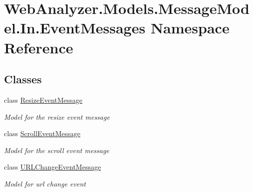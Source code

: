 \hypertarget{namespace_web_analyzer_1_1_models_1_1_message_model_1_1_in_1_1_event_messages}{}\section{Web\+Analyzer.\+Models.\+Message\+Model.\+In.\+Event\+Messages Namespace Reference}
\label{namespace_web_analyzer_1_1_models_1_1_message_model_1_1_in_1_1_event_messages}
\subsection*{Classes}
\begin{DoxyCompactItemize}
\item 
class \hyperlink{class_web_analyzer_1_1_models_1_1_message_model_1_1_in_1_1_event_messages_1_1_resize_event_message}{Resize\+Event\+Message}
\begin{DoxyCompactList}\small\item\em Model for the resize event message \end{DoxyCompactList}\item 
class \hyperlink{class_web_analyzer_1_1_models_1_1_message_model_1_1_in_1_1_event_messages_1_1_scroll_event_message}{Scroll\+Event\+Message}
\begin{DoxyCompactList}\small\item\em Model for the scroll event message \end{DoxyCompactList}\item 
class \hyperlink{class_web_analyzer_1_1_models_1_1_message_model_1_1_in_1_1_event_messages_1_1_u_r_l_change_event_message}{U\+R\+L\+Change\+Event\+Message}
\begin{DoxyCompactList}\small\item\em Model for url change event \end{DoxyCompactList}\end{DoxyCompactItemize}
